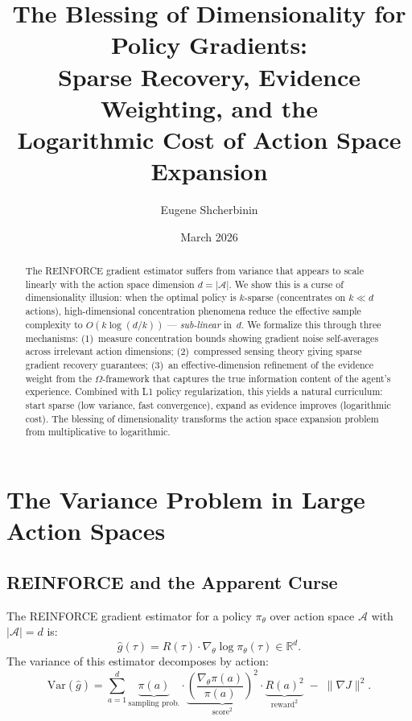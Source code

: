\documentclass[11pt,a4paper]{article}
\title{The Blessing of Dimensionality for Policy Gradients:\\
Sparse Recovery, Evidence Weighting, and the\\
Logarithmic Cost of Action Space Expansion}
\author{Eugene Shcherbinin}
\date{March 2026}
\newcommand{\R}{\mathbb{R}}
\newcommand{\norm}[1]{\|#1\|}
\begin{document}
\maketitle

\begin{abstract}
The REINFORCE gradient estimator suffers from variance that appears to
scale linearly with the action space dimension $d = |\mathcal{A}|$. We show
this is a curse of dimensionality illusion: when the optimal policy is
$k$-sparse (concentrates on $k \ll d$ actions), high-dimensional concentration
phenomena reduce the effective sample complexity to $O(k \log(d/k))$ ---
\emph{sub-linear} in~$d$. We formalize this through three mechanisms:
(1)~measure concentration bounds showing gradient noise self-averages
across irrelevant action dimensions; (2)~compressed sensing theory giving
sparse gradient recovery guarantees; (3)~an effective-dimension refinement
of the evidence weight from the $\Omega$-framework that captures the true
information content of the agent's experience. Combined with L1 policy
regularization, this yields a natural curriculum: start sparse (low
variance, fast convergence), expand as evidence improves (logarithmic
cost). The blessing of dimensionality transforms the action space expansion
problem from multiplicative to logarithmic.
\end{abstract}


\section{The Variance Problem in Large Action Spaces}

\subsection{REINFORCE and the Apparent Curse}

The REINFORCE gradient estimator for a policy $\pi_\theta$ over
action space $\mathcal{A}$ with $|\mathcal{A}| = d$ is:
\begin{equation}\label{eq:reinforce}
  \hat{g}(\tau) = R(\tau) \cdot \nabla_\theta \log \pi_\theta(\tau)
  \in \R^d.
\end{equation}
The variance of this estimator decomposes by action:
\begin{equation}\label{eq:variance-decomp}
  \text{Var}(\hat{g}) = \sum_{a=1}^{d}
    \underbrace{\pi(a)}_{\text{sampling prob.}} \cdot
    \underbrace{\left(\frac{\nabla_\theta \pi(a)}{\pi(a)}\right)^2}_{\text{score}^2} \cdot
    \underbrace{R(a)^2}_{\text{reward}^2}
    \;-\; \norm{\nabla J}^2.
\end{equation}
\end{document}
